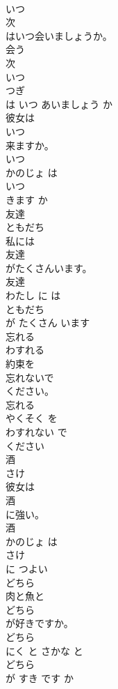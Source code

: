 \documentclass[8pt]{extreport}
\begin{document}
\begin{CJK}{UTF8}{min}
\\	いつ	
\\	次
\\	はいつ会いましょうか。	
\\	会う 
\\	次 
\\	いつ 
\\	つぎ
\\	は いつ あいましょう か	
\\	彼女は
\\	いつ
\\	来ますか。	
\\	いつ 
\\	かのじょ は 
\\	いつ
\\	きます か	
\\	友達	
\\	ともだち	
\\	私には
\\	友達
\\	がたくさんいます。	
\\	友達 
\\	わたし に は 
\\	ともだち
\\	が たくさん います	
\\	忘れる	
\\	わすれる	
\\	約束を
\\	忘れないで
\\	ください。	
\\	忘れる 
\\	やくそく を 
\\	わすれない で
\\	ください	
\\	酒	
\\	さけ	
\\	彼女は
\\	酒
\\	に強い。	
\\	酒 
\\	かのじょ は 
\\	さけ
\\	に つよい	
\\	どちら	
\\	肉と魚と
\\	どちら
\\	が好きですか。	
\\	どちら 
\\	にく と さかな と 
\\	どちら
\\	が すき です か	

\end{CJK}
\end{document}
